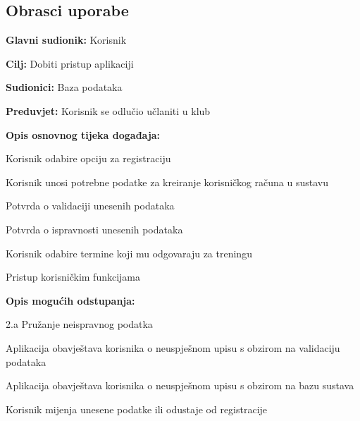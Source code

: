 \documentclass[times, utf8, zavrsni]{fer}
\newenvironment{packed_enum}{
	\begin{enumerate}
		\setlength{\itemsep}{0pt}
		\setlength{\parskip}{0pt}
		\setlength{\parsep}{0pt}
	}{\end{enumerate}}
\newenvironment{packed_item}{
	\begin{itemize}
		\setlength{\itemsep}{0pt}
		\setlength{\parskip}{0pt}
		\setlength{\parsep}{0pt}
	}{\end{itemize}}
\begin{document}
			\subsection{Obrasci uporabe}
			\noindent {}
					\begin{packed_item}
						
						\item \textbf{Glavni sudionik: } Korisnik
						\item  \textbf{Cilj:} Dobiti pristup aplikaciji
						\item  \textbf{Sudionici:} Baza podataka
						\item  \textbf{Preduvjet:} Korisnik se odlučio učlaniti u klub
						\item  \textbf{Opis osnovnog tijeka događaja:}
						
						\item[] \begin{packed_enum}
							
							\item Korisnik odabire opciju za registraciju
							\item Korisnik unosi potrebne podatke za kreiranje korisničkog računa u sustavu
							\item Potvrda o validaciji unesenih podataka
							\item Potvrda o ispravnosti unesenih podataka
							\item Korisnik odabire termine koji mu odgovaraju za treningu
							\item Pristup korisničkim funkcijama

							
						\end{packed_enum}
						
						\item  \textbf{Opis mogućih odstupanja:}
						
						\item[] \begin{packed_item}
							
							\item[2.a] Pružanje neispravnog podatka
							\item[] \begin{packed_enum}
								
								\item Aplikacija obavještava korisnika o neuspješnom upisu s obzirom na validaciju podataka
								\item Aplikacija obavještava korisnika o neuspješnom upisu s obzirom na bazu sustava
								\item Korisnik mijenja unesene podatke ili odustaje od registracije
								
							\end{packed_enum}
							
						\end{packed_item}
					\end{packed_item}
\end{document}
